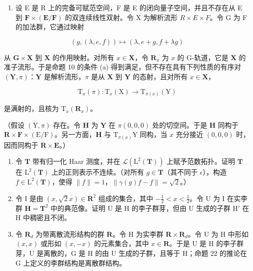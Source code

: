 \begin{enumerate}
\def\labelenumi{\arabic{enumi}.}
\setcounter{enumi}{6}
\tightlist
\item
  设 E 是 R 上的完备可赋范空间，F 是 E 的闭向量子空间，并且不存在从 E 到 \(\mathbf{F} \times (\mathbf{E}/\mathbf{F})\) 的双连续线性双射。令 X 为解析流形 \(R \times E \times F\)。令 G 为 F 的加法群，它通过映射
\end{enumerate}

\[
(g, (\lambda , e, f)) \mapsto (\lambda , e + g, f + \lambda g)
\]

从 \(\mathbf{G} \times \mathbf{X}\) 到 \(\mathbf{X}\) 的作用映射。对所有 \(x \in \mathbf{X}\)，令 \(\mathbf{R}_x\) 为 \(x\) 的 G-轨道，它是 \(\mathbf{X}\) 的准子流形。于是命题 10 的条件 (a) 得到满足，但不存在具有下列性质的有序对 \((\mathbf{Y}, \pi)\)：\(\mathbf{Y}\) 是解析流形，\(\pi\) 是从 \(\mathbf{X}\) 到 \(\mathbf{Y}\) 的态射，且对所有 \(x \in \mathbf{X}\)，

\[
\mathrm{T} _ {x} (\pi): \mathrm{T} _ {x} (\mathrm{X}) \rightarrow \mathrm{T} _ {\pi (x)} (\mathrm{Y})
\]

是满射的，且核为 \(\mathrm{T}_x(\mathbf{R}_x)\)。

（假设 \((\mathrm{Y},\pi)\) 存在。令 \(\mathbf{H}\) 为 \(\mathbf{Y}\) 在 \(\pi (0,0,0)\) 处的切空间。于是 \(\mathbf{H}\) 同构于 \(\mathbf{R}\times \mathbf{F}\times (\mathrm{E} / \mathrm{F})\)。另一方面，\(\mathbf{H}\) 与 \(\mathrm{T}_{\pi (x)}\mathrm{Y}\) 同构，当 \(x\) 充分接近 \((0,0,0)\) 时，因而同构于 \(\mathbf{R}\times \mathbf{E}\)。）

\begin{enumerate}
\def\labelenumi{\arabic{enumi}.}
\setcounter{enumi}{7}
\item
  令 \(\mathbf{T}\) 带有归一化 Haar 测度，并在 \(\mathcal{L}(\mathrm{L}^2 (\mathbf{T}))\) 上赋予范数拓扑。证明 \(\mathbf{T}\) 在 \(\mathrm{L}^2 (\mathbf{T})\) 上的正则表示不连续。（对所有 \(g\in \mathbf{T}\)（其不同于 \(\epsilon\)），构造 \(f\in \mathrm{L}^2 (\mathbf{T})\)，使得 \(\| f\| = 1\)，\(\| \gamma (g)f - f\| = \sqrt{2}\)。）
\item
  令 I 是由 \((x, \sqrt{2} x) \in \mathbf{R}^2\) 组成的集合，其中 \(-\frac{1}{2} < x < \frac{1}{2}\)。令 U 为 I 在实李群 \(\mathbf{H} = \mathbf{T}^2\) 中的典范像。证明 U 是 H 的李子群芽，但由 U 生成的子群 \(\mathrm{H}'\) 在 H 中稠密且不闭。
\item
  令 \(\mathbf{R}_d\) 为带离散流形结构的群 \(\mathbf{R}\)。令 \(\mathrm{H}\) 为实李群 \(\mathbf{R} \times \mathbf{R}_d\)。令 \(\mathrm{U}\) 为 \(\mathrm{H}\) 中形如 \((x, x)\) 或形如 \((x, -x)\) 的元素集合，其中 \(x \in \mathbf{R}\)。于是 \(\mathrm{U}\) 是 \(\mathrm{H}\) 的李子群芽，\(\mathrm{U}\) 是离散的，\(\mathrm{G}\) 是 \(\mathrm{H}\) 的由 \(\mathrm{U}\) 生成的子群，且等于 \(\mathrm{H}\)；命题 22 的推论在 \(\mathrm{G}\) 上定义的李群结构是离散群结构。
\end{enumerate}

